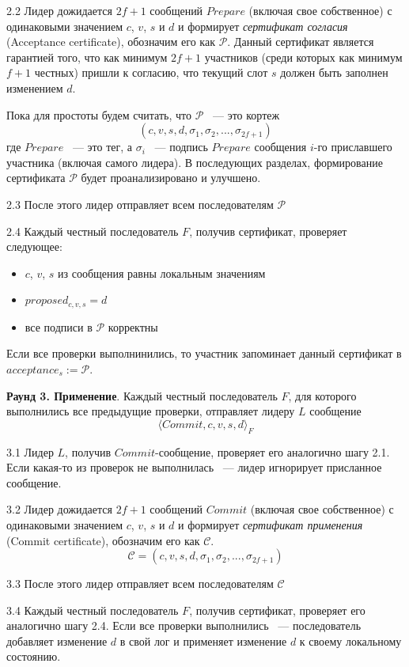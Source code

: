 2.2 Лидер дожидается $2f+1$ сообщений $Prepare$ (включая свое собственное) с одинаковыми значением $c$, $v$, $s$ и $d$ и формирует \textit{сертификат согласия} (Acceptance certificate), обозначим его как $\mathcal{P}$. Данный сертификат является гарантией того, что как минимум $2f+1$ участников (среди которых как минимум $f+1$ честных) пришли к согласию, что текущий слот $s$ должен быть заполнен изменением $d$.

Пока для простоты будем считать, что $\mathcal{P}$ ~--- это кортеж
$$(c, v, s, d, \sigma_1, \sigma_2, ..., \sigma_{2f+1})$$
где $Prepare$ ~--- это тег, а $\sigma_i$ ~--- подпись $Prepare$ сообщения $i$-го приславшего участника (включая самого лидера). 
В последующих разделах, формирование сертификата $\mathcal{P}$ будет проанализировано и улучшено.

2.3 После этого лидер отправляет всем последователям  $\mathcal{P}$

2.4 Каждый честный последователь $F$, получив сертификат, проверяет следующее:
\begin{itemize}
\item $c$, $v$, $s$ из сообщения равны локальным значениям
\item $proposed_{c, v, s} = d$
\item все подписи в $\mathcal{P}$ корректны
\end{itemize}
\vspace{10pt}

Если все проверки выполнинились, то участник запоминает данный сертификат в $acceptance_s := \mathcal{P}$.
\vspace{10pt}

\textbf{Раунд 3. Применение}.
Каждый честный последователь $F$, для которого выполнились все предыдущие проверки, отправляет лидеру $L$ сообщение 
\[ \langle Commit, c, v, s, d \rangle_F \]

3.1 Лидер $L$, получив $Commit$-сообщение, проверяет его аналогично шагу 2.1.
Если какая-то из проверок не выполнилась ~--- лидер игнорирует присланное сообщение. 

3.2 Лидер дожидается $2f+1$ сообщений $Commit$ (включая свое собственное) с одинаковыми значением $c$, $v$, $s$ и $d$ и формирует \textit{сертификат применения} (Commit certificate), обозначим его как $\mathcal{C}$.
$$\mathcal{C}=(c, v, s, d, \sigma_1, \sigma_2, ..., \sigma_{2f+1})$$

3.3 После этого лидер отправляет всем последователям  $\mathcal{C}$

3.4 Каждый честный последователь $F$, получив сертификат, проверяет его аналогично шагу 2.4.
Если все проверки выполнились ~--- последователь добавляет изменение $d$ в свой лог и  применяет изменение $d$ к своему локальному состоянию.
\vspace{10pt}

